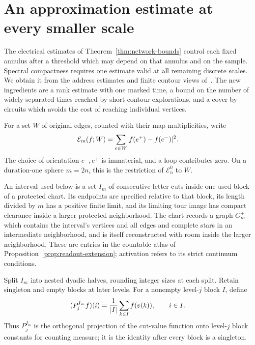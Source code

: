 \section{An approximation estimate at every smaller scale}
\label{sec:compactness}

The electrical estimates of Theorem~\ref{thm:network-bounds} control
each fixed annulus after a threshold which may depend on that annulus
and on the sample.  Spectral compactness requires one estimate valid
at all remaining discrete scales.  We obtain it from the address
estimates and finite contour views of~\cite{P}.  The new ingredients
are a rank estimate with one marked time, a bound on the number of
widely separated times reached by short contour explorations, and a
cover by circuits which avoids the cost of reaching individual
vertices.

For a set \(W\) of original edges, counted with their map
multiplicities, write
\[
 \mathcal E_m(f;W)=\sum_{e\in W}\lvert f(e^+)-f(e^-)\rvert^2.
\]
The choice of orientation \(e^-,e^+\) is immaterial, and a loop
contributes zero.  On a duration-one sphere \(m=2n\), this is the
restriction of \(\mathcal E_n^0\) to \(W\).

An interval used below is a set \(I_m\) of consecutive letter cuts
inside one used block of a protected chart.  Its endpoints are
specified relative to that block, its length divided by \(m\) has a
positive finite limit, and its limiting tour image has compact
clearance inside a larger protected neighborhood.  The chart records
a graph \(G_m^+\) which contains the interval's vertices and all
edges and complete stars in an intermediate neighborhood, and is
itself reconstructed with room inside the larger neighborhood.
These are entries in the countable atlas of
Proposition~\ref{prop:readout-extension}; activation refers to its
strict continuum conditions.

Split \(I_m\) into nested dyadic halves, rounding integer sizes at
each split.  Retain singleton and empty blocks at later levels.  For
a nonempty level-\(j\) block \(I\), define
\[
 (P_j^{I_m}f)(i)=\frac1{\lvert I\rvert}\sum_{k\in I}f(v(k)),
 \qquad i\in I.
\]
Thus \(P_j^{I_m}\) is the orthogonal projection of the cut-value
function onto level-\(j\) block constants for counting measure; it
is the identity after every block is a singleton.


